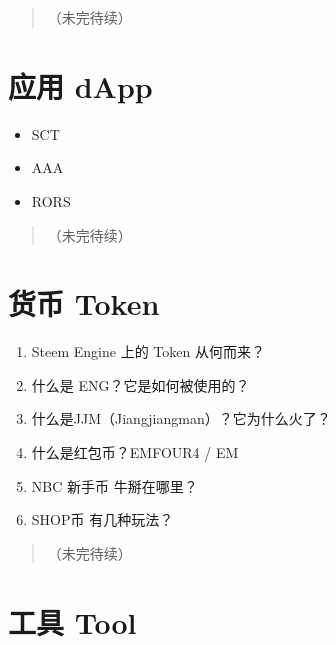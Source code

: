 \documentclass[]{ctexbook}
\providecommand{\tightlist}{%
  \setlength{\itemsep}{0pt}\setlength{\parskip}{0pt}}
\begin{document}
\begin{quote}
（未完待续）
\end{quote}

\hypertarget{dapp}{%
\chapter{应用 dApp}\label{dapp}}

\begin{itemize}
\tightlist
\item
  SCT
\item
  AAA
\item
  RORS
\end{itemize}

\begin{quote}
（未完待续）
\end{quote}

\hypertarget{token}{%
\chapter{货币 Token}\label{token}}

\begin{enumerate}
\def\labelenumi{\arabic{enumi}.}
\tightlist
\item
  Steem Engine 上的 Token 从何而来？
\item
  什么是 ENG？它是如何被使用的？
\item
  什么是JJM（Jiangjiangman）？它为什么火了？
\item
  什么是红包币？EMFOUR4 / EM
\item
  NBC 新手币 牛掰在哪里？
\item
  SHOP币 有几种玩法？
\end{enumerate}

\begin{quote}
（未完待续）
\end{quote}

\hypertarget{tool}{%
\chapter{工具 Tool}\label{tool}}
\end{document}
